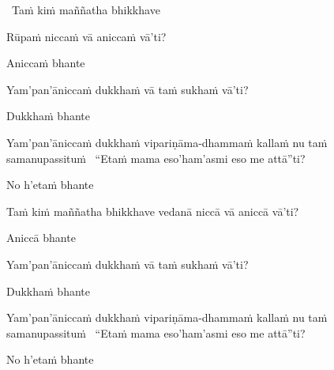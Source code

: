\begin{pali-leader}
  \anglebracketleft\ \hspace{-0.5mm}Taṁ kiṁ maññatha bhikkhave \hspace{-0.5mm}\anglebracketright\
\end{pali-leader}
\begin{pali-hangtogether}
  Rūpaṁ niccaṁ vā aniccaṁ vā'ti?
\end{pali-hangtogether}
\begin{pali-hangtogether}
  Aniccaṁ bhante
\end{pali-hangtogether}
\begin{pali-hangtogether}
  Yam'pan'āniccaṁ dukkhaṁ vā taṁ sukhaṁ vā'ti?
\end{pali-hangtogether}
\begin{pali-hangtogether}
  Dukkhaṁ bhante
\end{pali-hangtogether}
\begin{pali-hangtogether}
  Yam'pan'āniccaṁ dukkhaṁ vipariṇāma-dhammaṁ kallaṁ nu taṁ samanupassituṁ \breathmark\ ``Etaṁ mama eso'ham'asmi eso me attā''ti?
\end{pali-hangtogether}
\begin{pali-hangtogether}
  No h'etaṁ bhante
\end{pali-hangtogether}

\begin{pali-hang}
  Taṁ kiṁ maññatha bhikkhave vedanā niccā vā aniccā vā'ti?
\end{pali-hang}
\begin{pali-hangtogether}
  Aniccā bhante
\end{pali-hangtogether}
\begin{pali-hangtogether}
  Yam'pan'āniccaṁ dukkhaṁ vā taṁ sukhaṁ vā'ti?
\end{pali-hangtogether}
\begin{pali-hangtogether}
  Dukkhaṁ bhante
\end{pali-hangtogether}
\begin{pali-hangtogether}
  Yam'pan'āniccaṁ dukkhaṁ vipariṇāma-dhammaṁ kallaṁ nu taṁ samanupassituṁ \breathmark\ ``Etaṁ mama eso'ham'asmi eso me attā''ti?
\end{pali-hangtogether}
\begin{pali-hangtogether}
  No h'etaṁ bhante
\end{pali-hangtogether}

